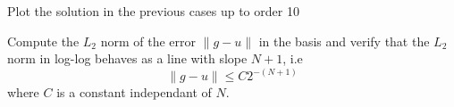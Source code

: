 \documentclass{article}
\begin{document}
\begin{Exercise}[title={p type Galerkin method in 1D}]
  \Question Plot the solution in the previous cases up to order 10

  \Question Compute the $L_2$ norm of the error $\|g-u\|$ in the basis
  and verify that the $L_2$ norm in log-log behaves as a line with slope $N+1$, i.e
  \begin{equation}
    \label{eq:13}
    \|g-u\| \leq C 2^{-(N+1)}
  \end{equation}
  where $C$ is a constant independant of $N$.
\end{Exercise}

\begin{Answer}
\end{Answer}
\end{document}
